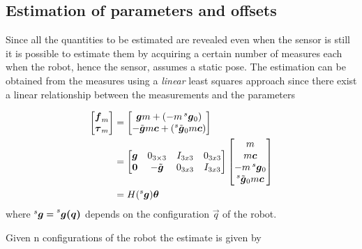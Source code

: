\subsection{Estimation of parameters and offsets}
Since all the quantities to be estimated are revealed even when the sensor is still
it is possible to estimate them by acquiring a certain number of measures each when
the robot, hence the sensor, assumes a static pose. The estimation can be obtained
from the measures using a \emph{linear} least squares approach since there exist
a linear relationship between the measurements and the parameters

\[
\begin{split}
  \begin{bmatrix}
    \vec{f}_{m} \\
    \vec{\tau}_{m} \\
  \end{bmatrix} &=
  \begin{bmatrix}
    \vec{g} m + (-m \prescript{s}{}{ \vec{g}}_{0}) \\
    -\tilde{\vec{g}} m\vec{c} + (\prescript{s}{}{ \tilde{\vec{g}}}_{0} m\vec{c}) \\
  \end{bmatrix}\\
  & =
  \begin{bmatrix}
    \vec{g} & 0_{3 \times 3} & I_{3x3} & 0_{3x3} \\
    \vec{0} & -\tilde{\vec{g}} & 0_{3x3} & I_{3x3}
  \end{bmatrix}
  \begin{bmatrix}
    m \\
    m \vec{c} \\
    -m \prescript{s}{}{ \vec{g}}_{0} \\
    \prescript{s}{}{ \tilde{\vec{g}}}_{0} m\vec{c} \\
  \end{bmatrix}\\
  &=
  H(\prescript{s}{}{ \vec{g}}) \vec{\theta}
\end{split}
\]
where $\prescript{s}{}{ \vec{g}} = \prescript{s}{}{ \vec{g(\vec{q})}}$ depends on the configuration $\vec{q}$ of the robot.
\par
Given n configurations of the robot the estimate is given by
